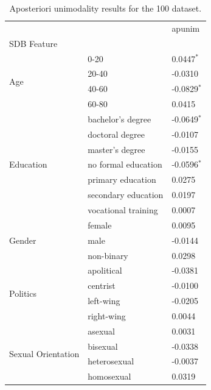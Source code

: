 \begin{table}[ht]
\caption{Aposteriori unimodality results for the 100 dataset.}
\label{tab:synthetic_100}
\begin{tabular}{lll}
\toprule
 &  & apunim \\
SDB Feature &  &  \\
\midrule
\multirow[t]{4}{*}{Age} & 0-20 & 0.0447$^{*}$ \\
 & 20-40 & -0.0310 \\
 & 40-60 & -0.0829$^{*}$ \\
 & 60-80 & 0.0415 \\
\cline{1-3}
\multirow[t]{7}{*}{Education} & bachelor's degree & -0.0649$^{*}$ \\
 & doctoral degree & -0.0107 \\
 & master's degree & -0.0155 \\
 & no formal education & -0.0596$^{*}$ \\
 & primary education & 0.0275 \\
 & secondary education & 0.0197 \\
 & vocational training & 0.0007 \\
\cline{1-3}
\multirow[t]{3}{*}{Gender} & female & 0.0095 \\
 & male & -0.0144 \\
 & non-binary & 0.0298 \\
\cline{1-3}
\multirow[t]{4}{*}{Politics} & apolitical & -0.0381 \\
 & centrist & -0.0100 \\
 & left-wing & -0.0205 \\
 & right-wing & 0.0044 \\
\cline{1-3}
\multirow[t]{4}{*}{Sexual Orientation} & asexual & 0.0031 \\
 & bisexual & -0.0338 \\
 & heterosexual & -0.0037 \\
 & homosexual & 0.0319 \\
\cline{1-3}
\bottomrule
\end{tabular}
\end{table}
